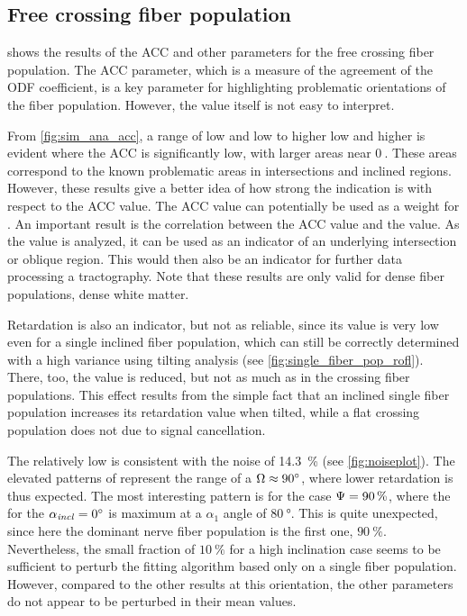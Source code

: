 \subsection{Free crossing fiber population}
 shows the results of the \ac{ACC} and other parameters for the free crossing fiber population.
The \ac{ACC} parameter, which is a measure of the agreement of the \ac{ODF} coefficient, is a key parameter for highlighting problematic orientations of the fiber population.
However, the value itself is not easy to interpret.
\par
%
From \ref{fig:sim_ana_acc}, a range of low \modelPsi{} and low \modelInc{} to higher low \modelPsi{} and higher \modelInc{} is evident where the \ac{ACC} is significantly low, with larger areas near $\SI{0}{}$.
These areas correspond to the known problematic areas in intersections and inclined regions.
However, these results give a better idea of how strong the indication is with respect to the \ac{ACC} value.
The \ac{ACC} value can potentially be used as a weight for .
An important result is the correlation between the \ac{ACC} value and the \trel{} value.
As the \trel{} value is analyzed, it can be used as an indicator of an underlying intersection or oblique region.
This would then also be an indicator for further data processing \eg{} a tractography.
Note that these results are only valid for dense fiber populations, \ie{} dense white matter.
\par
%
Retardation is also an indicator, but not as reliable, since its value is very low even for a single inclined fiber population, which can still be correctly determined with a high variance using tilting analysis (see \cref{fig:single_fiber_pop_rofl}).
There, too, the \trel{} value is reduced, but not as much as in the crossing fiber populations.
This effect results from the simple fact that an inclined single fiber population increases its retardation value when tilted, while a flat crossing population does not due to signal cancellation.
\par
%
The relatively low \rvalue{} is consistent with the noise of \SI{14.3}{\percent} (see \cref{fig:noiseplot}).
The elevated patterns of \rvalue{} represent the range of a $\textnormal{$\Omega$} \approx \SI{90}{\degree}$, where lower retardation is thus expected.
The most interesting pattern is for the case $\textnormal{$\Psi$} = \SI{90}{\percent}$, where the \rvalue{} for the $\textnormal{$\alpha_{\mathit{incl}}$} = \SI{0}{\degree}$ is maximum at a $\alpha_1$  angle of $\SI{80}{\degree}$.
This is quite unexpected, since here the dominant nerve fiber population is the first one, \ie{} $\SI{90}{\percent}$.
Nevertheless, the small fraction of $\SI{10}{\percent}$ for a high inclination case seems to be sufficient to perturb the fitting algorithm based only on a single fiber population.
However, compared to the other results at this orientation, the other parameters do not appear to be perturbed in their mean values.
%
%
%
